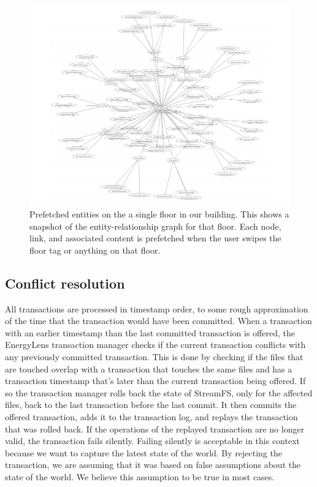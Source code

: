 \begin{figure}[htb!]
\begin{center}
\includegraphics[scale=0.35]{figs/SDH_4F_ERG}
\caption{Prefetched entities on the a single floor in our building.  This shows a snapshot of the entity-relationship
graph for that floor.  Each node, link, and associated content is prefetched when the user swipes the floor
tag or anything on that floor.}
\label{fig:sdh_4f_erg}
\end{center}
\end{figure}

\subsection{Conflict resolution}
All transactions are processed in timestamp order, to some rough approximation of the time that the transaction would have been committed.  When a transaction with an earlier timestamp than the last committed transaction is offered, the EnergyLens transaction manager checks if the current transaction conflicts with any previously committed transaction.  This is done by checking if the files that are touched overlap with a transaction that touches the same files and has a transaction timestamp that’s later than the current transaction being offered.  If so the transaction manager rolls back the state of StreamFS, only for the affected files, back to the last transaction before the last commit.  It then commits the offered transaction, adds it to the transaction log, and replays the transaction that was rolled back.  If the operations of the replayed transaction are no longer valid, the transaction fails silently.  Failing silently is acceptable in this context because we want to capture the latest state of the world.  By rejecting the transaction, we are assuming that it was based on false assumptions about the state of the world.  We believe this assumption to be true in most cases.


